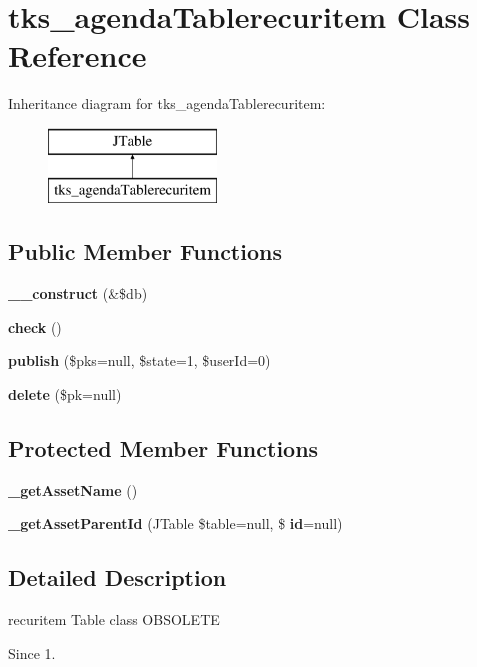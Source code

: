 \section{tks\+\_\+agenda\+Tablerecuritem Class Reference}
\label{classtks__agenda_tablerecuritem}
Inheritance diagram for tks\+\_\+agenda\+Tablerecuritem\+:\begin{figure}[H]
\begin{center}
\leavevmode
\includegraphics[height=2.000000cm]{classtks__agenda_tablerecuritem}
\end{center}
\end{figure}
\subsection*{Public Member Functions}
\begin{DoxyCompactItemize}
\item 
\textbf{ \+\_\+\+\_\+construct} (\&\$db)
\item 
\textbf{ check} ()
\item 
\textbf{ publish} (\$pks=null, \$state=1, \$user\+Id=0)
\item 
\textbf{ delete} (\$pk=null)
\end{DoxyCompactItemize}
\subsection*{Protected Member Functions}
\begin{DoxyCompactItemize}
\item 
\textbf{ \+\_\+get\+Asset\+Name} ()
\item 
\textbf{ \+\_\+get\+Asset\+Parent\+Id} (J\+Table \$table=null, \$\textbf{ id}=null)
\end{DoxyCompactItemize}


\subsection{Detailed Description}
recuritem Table class O\+B\+S\+O\+L\+E\+TE

\begin{DoxySince}{Since}
1. 
\end{DoxySince}


